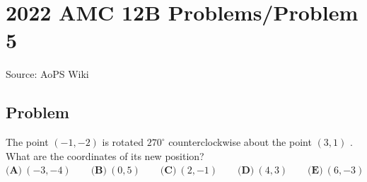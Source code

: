 \documentclass[12pt]{article}
\begin{document}
\section*{{2022 AMC 12B Problems/Problem 5}}
Source: AoPS Wiki

\subsection*{Problem}
The point $(-1, -2)$ is rotated $270^{\circ}$ counterclockwise about the point $(3, 1)$ . What are the coordinates of its new position? $\textbf{(A)}\ (-3, -4) \qquad \textbf{(B)}\ (0,5) \qquad \textbf{(C)}\ (2,-1) \qquad \textbf{(D)}\ (4,3) \qquad \textbf{(E)}\ (6,-3)$
\end{document}

